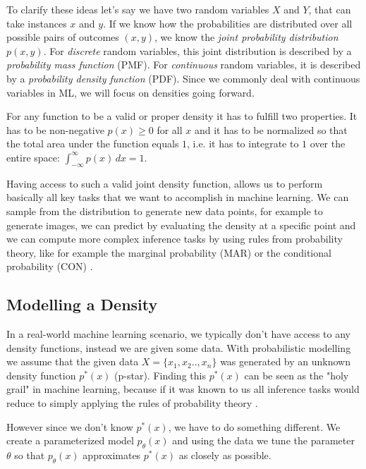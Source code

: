 To clarify these ideas let's say we have two random variables $X$ and $Y$, that can take instances $x$ and $y$. 
If we know how the probabilities are distributed over all possible pairs of outcomes $(x, y)$, we know the \textit{joint probability distribution} $p(x, y)$.
For \textit{discrete} random variables, this joint distribution is described by a \textit{probability mass function} (PMF). 
For \textit{continuous} random variables, it is described by a \textit{probability density function} (PDF).
Since we commonly deal with continuous variables in ML, we will focus on densities going forward.

For any function to be a valid or proper density it has to fulfill two properties. 
It has to be non-negative $p(x) \geq 0$ for all $x$
and it has to be normalized so that the total area under the function equals $1$, i.e. it has to integrate to $1$ over the entire space: $\int_{-\infty}^{\infty} p(x) \, dx = 1$.

Having access to such a valid joint density function, allows us to perform basically all key tasks that we want to accomplish in machine learning. 
We can sample from the distribution to generate new data points, for example to generate images, we can predict by evaluating the density at a specific point and 
we can compute more complex inference tasks by using rules from probability theory, like for example the marginal probability (MAR) or 
the conditional probability (CON) \cite{pc_intro}.

\subsection{Modelling a Density}
\label{sec:modelling_a_density}

In a real-world machine learning scenario, we typically don't have access to any density functions, instead 
we are given some data. With probabilistic modelling we assume that the given data $ X = \{x_1, x_2 .. , x_n\}$ was generated by an unknown density function $p^*(x)$ (p-star).
Finding this $p^*(x)$ can be seen as the "holy grail" in machine learning, because if it was known to us all inference tasks would reduce to simply applying the 
rules of probability theory \cite{pc_intro}.

However since we don't know $p^*(x)$, we have to do something different.
We create a parameterized model $p_\theta(x)$ and using the data we tune the parameter $\theta$ so that $p_\theta(x)$ approximates $p^*(x)$ as closely as possible.

